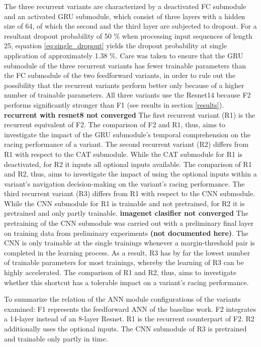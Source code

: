 The three recurrent variants
are characterized by a deactivated FC submodule and 
an activated GRU submodule,
which consist of three layers
with a hidden size of 64,
of which the second and the third layer
are subjected to dropout.
For a resultant dropout probability of 50 \%
when processing input sequences of length 25,
equation \ref{eq:single_dropout} yields the dropout probability 
at single application of approximately 1.38 \%.
Care was taken to ensure that the GRU submodule 
of the three recurrent variants has fewer trainable parameters
than the FC submodule of the two feedforward variants,
in order to rule out the possibility 
that the recurrent variants perform better only 
because of a higher number of trainable parameters.
All three variants use the Resnet14 
because F2 performs significantly stronger than F1
(see results in section \ref{results}).
\textbf{recurrent with resnet8 not converged}
The first recurrent variant (R1)
is the recurrent equivalent of F2.
The comparison of F2 and R1, thus,
aims to investigate the impact of the GRU submodule's 
temporal comprehension on the racing performance of a variant.
The second recurrent variant (R2) differs 
from R1 with respect to the CAT submodule.
While the CAT submodule for R1 is deactivated,
for R2 it inputs
all optional inputs available.
The comparison of R1 and R2, thus,
aims to investigate the impact of 
using the optional inputs
within a variant's navigation decision-making
on the variant's racing performance.
The third recurrent variant (R3) differs 
from R1 with respect to the CNN submodule.
While the CNN submodule for R1 is trainable and not pretrained,
for R2 it is pretrained and only partly trainable.
\textbf{imagenet clasifier not converged}
The pretraining of the CNN submodule
was carried out with a preliminary final layer
on training data from 
preliminary experiments \textbf{(not documented here)}.
The CNN is only trainable at the single trainings
whenever a margin-threshold pair is completed in the learning process.
As a result, R3 has by far the lowest number of trainable parameters
for most trainings, whereby 
the learning of R3 can be highly accelerated.
The comparison of R1 and R2, thus,
aims to investigate 
whether this shortcut
has a tolerable impact on a
variant's racing performance.

To summarize the relation of the ANN module configurations of the variants examined: 
F1 represents the feedforward ANN of the baseline work.
F2 integrates a 14-layer instead of an 8-layer Resnet.
R1 is the recurrent counterpart of F2.
R2 additionally uses the optional inputs.
The CNN submodule of R3 is pretrained  
and trainable only partly in time.

